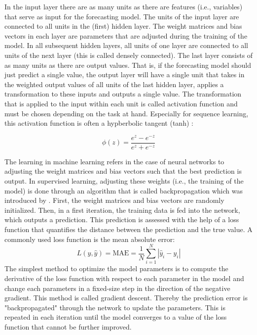 In the input layer there are as many units as there are features (i.e., variables) that serve as input for the forecasting model. The units of the input layer are connected to all units in the (first) hidden layer. The weight matrices and bias vectors in each layer are parameters that are adjusted during the training of the model. In all subsequent hidden layers, all units of one layer are connected to all units of the next layer (this is called densely connected). The last layer consists of as many units as there are output values. That is, if the forecasting model should just predict a single value, the output layer will have a single unit that takes in the weighted output values of all units of the last hidden layer, applies a transformation to these inputs and outputs a single value. The transformation that is applied to the input within each unit is called activation function and must be chosen depending on the task at hand. Especially for sequence learning, this activation function is often a hypberbolic tangent (tanh) \citep{Lipton:2015}:

\begin{equation} \label{activation}
    \phi(z)=\frac{e^z-e^{-z}}{e^z+e^{-z}}
\end{equation}

The learning in machine learning refers in the case of neural networks to adjusting the weight matrices and bias vectors such that the best prediction is output. In supervised learning, adjusting these weights (i.e., the training of the model) is done through an algorithm that is called backpropagation which was introduced by \citet{Rumelhart:1986}. First, the weight matrices and bias vectors are randomly initialized. Then, in a first iteration, the training data is fed into the network, which outputs a prediction. This prediction is assessed with the help of a loss function that quantifies the distance between the prediction and the true value. A commonly used loss function is the mean absolute error:
%
\begin{equation} \label{lossMAE}
    L\left(y, \widehat{y}\right)=\text{MAE}=\frac{1}{N}\sum_{i=1}^N\left|\widehat{y}_i-y_i\right|
\end{equation}
%
The simplest method to optimize the model parameters is to compute the derivative of the loss function with respect to each parameter in the model and change each parameters in a fixed-size step in the direction of the negative gradient. This method is called gradient descent. Thereby the prediction error is "backpropagated" through the network to update the parameters. This is repeated in each iteration until the model converges to a value of the loss function that cannot be further improved.



